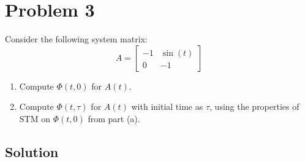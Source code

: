 \section*{Problem 3}

Consider the following system matrix:
\begin{equation*}
    A
    =
    \begin{bmatrix}
        -1 & \sin(t) \\
        0  & -1
    \end{bmatrix}
\end{equation*}
\begin{enumerate}[label= (\alph*)]
    \item Compute \( \Phi(t, 0) \) for \( A(t) \).
    \item Compute \( \Phi(t, \tau) \) for \( A(t) \) with initial time as \( \tau \), using the properties of STM on \( \Phi(t, 0) \) from part (a).
\end{enumerate}

\subsection*{Solution}
